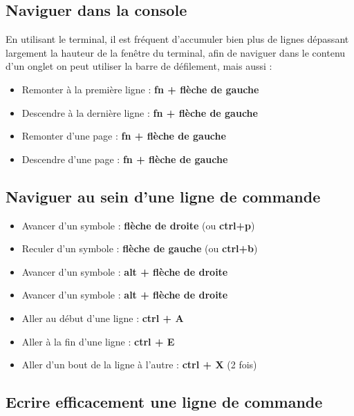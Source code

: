 \subsection{Naviguer dans la console}\label{naviguer-dans-la-console}

En utilisant le terminal, il est fréquent d'accumuler bien plus de
lignes dépassant largement la hauteur de la fenêtre du terminal, afin de
naviguer dans le contenu d'un onglet on peut utiliser la barre de
défilement, mais aussi :

\begin{itemize}
\tightlist
\item
  Remonter à la première ligne : \textbf{fn + flèche de gauche}
\item
  Descendre à la dernière ligne : \textbf{fn + flèche de gauche}
\item
  Remonter d'une page : \textbf{fn + flèche de gauche}
\item
  Descendre d'une page : \textbf{fn + flèche de gauche}
\end{itemize}

\subsection{Naviguer au sein d'une ligne de
commande}\label{naviguer-au-sein-dune-ligne-de-commande}

\begin{itemize}
\tightlist
\item
  Avancer d'un symbole : \textbf{flèche de droite} (ou \textbf{ctrl+p})
\item
  Reculer d'un symbole : \textbf{flèche de gauche} (ou \textbf{ctrl+b})
\item
  Avancer d'un symbole : \textbf{alt + flèche de droite}
\item
  Avancer d'un symbole : \textbf{alt + flèche de droite}
\item
  Aller au début d'une ligne : \textbf{ctrl + A}\\
\item
  Aller à la fin d'une ligne : \textbf{ctrl + E}\\
\item
  Aller d'un bout de la ligne à l'autre : \textbf{ctrl + X} (2 fois)
\end{itemize}

\subsection{Ecrire efficacement une ligne de
commande}\label{ecrire-efficacement-une-ligne-de-commande}

